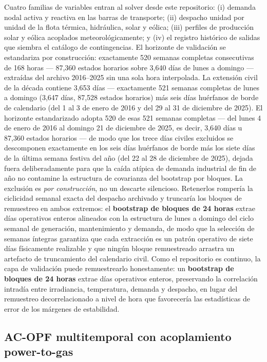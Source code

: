 Cuatro familias de variables entran al solver desde este repositorio: (i) demanda nodal activa y reactiva en las barras de transporte; (ii) despacho unidad por unidad de la flota térmica, hidráulica, solar y eólica; (iii) perfiles de producción solar y eólica acoplados meteorológicamente; y (iv) el registro histórico de salidas que siembra el catálogo de contingencias. El horizonte de validación se estandariza por construcción: exactamente 520 semanas completas consecutivas de 168 horas --- 87,360 estados horarios sobre 3,640 días de lunes a domingo --- extraídas del archivo 2016--2025 sin una sola hora interpolada. La extensión civil de la década contiene 3,653 días --- exactamente 521 semanas completas de lunes a domingo (3,647 días, 87,528 estados horarios) más seis días huérfanos de borde de calendario (del 1 al 3 de enero de 2016 y del 29 al 31 de diciembre de 2025). El horizonte estandarizado adopta 520 de esas 521 semanas completas --- del lunes 4 de enero de 2016 al domingo 21 de diciembre de 2025, es decir, 3,640 días u 87,360 estados horarios --- de modo que los trece días civiles excluidos se descomponen exactamente en los seis días huérfanos de borde más los siete días de la última semana festiva del año (del 22 al 28 de diciembre de 2025), dejada fuera deliberadamente para que la caída atípica de demanda industrial de fin de año no contamine la estructura de covarianza del bootstrap por bloques. La exclusión es \emph{por construcción}, no un descarte silencioso. Retenerlos rompería la ciclicidad semanal exacta del despacho archivado y truncaría los bloques de remuestreo en ambos extremos: el \textbf{bootstrap de bloques de 24 horas} extrae días operativos enteros alineados con la estructura de lunes a domingo del ciclo semanal de generación, mantenimiento y demanda, de modo que la selección de semanas íntegras garantiza que cada extracción es un patrón operativo de siete días físicamente realizable y que ningún bloque remuestreado arrastra un artefacto de truncamiento del calendario civil. Como el repositorio es continuo, la capa de validación puede remuestrearlo honestamente: un \textbf{bootstrap de bloques de 24 horas} extrae días operativos enteros, preservando la correlación intradía entre irradiancia, temperatura, demanda y despacho, en lugar del remuestreo decorrelacionado a nivel de hora que favorecería las estadísticas de error de los márgenes de estabilidad.

\subsection{AC-OPF multitemporal con acoplamiento power-to-gas}
\label{sub:opf}

